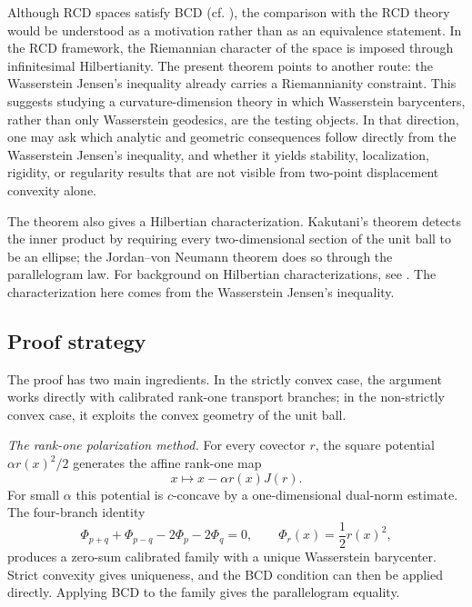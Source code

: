 \documentclass[10pt,a4paper]{amsart}
\numberwithin{equation}{section}
\begin{document}
	Although RCD spaces satisfy BCD (cf. \cite{HanLiuZhuBCD}), the comparison with the RCD theory would be understood as a motivation rather than as an equivalence statement. In the RCD framework, the Riemannian character of the space is imposed through infinitesimal Hilbertianity. The present theorem points to another route: the Wasserstein Jensen's inequality already carries a Riemannianity constraint. This suggests studying a curvature-dimension theory in which Wasserstein barycenters, rather than only Wasserstein geodesics, are the testing objects. In that direction, one may ask which analytic and geometric consequences follow directly from the Wasserstein Jensen's inequality, and whether it yields stability, localization, rigidity, or regularity results that are not visible from two-point displacement convexity alone.
	
	\medskip
	
	The theorem also gives a Hilbertian characterization. Kakutani's theorem \cite{Kakutani1939} detects the inner product by requiring every two-dimensional section of the unit ball to be an ellipse; the Jordan--von Neumann theorem \cite{JordanvonNeumann1935} does so through the parallelogram law. For background on Hilbertian characterizations, see \cite{Amir1986}. The characterization here comes from the Wasserstein Jensen's inequality.
	
	\medskip
	
	\subsection*{Proof strategy}\label{subsec:proof-strategy}
	The proof has two main ingredients. In the strictly convex case, the argument works directly with calibrated rank-one transport branches; in the non-strictly convex case, it exploits the convex geometry of the unit ball.
	
	
	
	
	\medskip\noindent\textit{The rank-one polarization method.}
	For every covector \(r\), the square potential \(\alpha r(x)^2/2\) generates the affine rank-one map
	\[
	x\longmapsto x-\alpha r(x)J(r).
	\]
	For small \(\alpha\) this potential is \(c\)-concave by a one-dimensional dual-norm estimate. The four-branch identity
	\[
	\Phi_{p+q}+\Phi_{p-q}-2\Phi_p-2\Phi_q=0,
	\qquad \Phi_r(x)=\frac12r(x)^2,
	\]
	produces a zero-sum calibrated family with a unique Wasserstein barycenter. Strict convexity gives uniqueness, and the BCD condition can then be applied directly. Applying BCD to the family gives the parallelogram equality.
	
\end{document}
